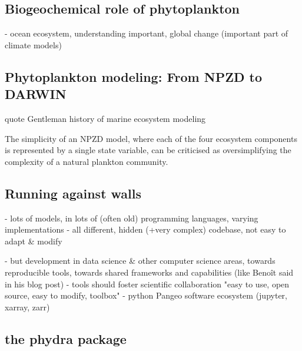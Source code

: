 \documentclass[journal abbreviation, manuscript]{copernicus}
\begin{document}
\introduction  %



\subsection{Biogeochemical role of phytoplankton}
- ocean ecosystem, understanding important, global change (important part of climate models)

\subsection{Phytoplankton modeling: From NPZD to DARWIN}
quote Gentleman history of marine ecosystem modeling

The simplicity of an NPZD model, where each of the four ecosystem components is represented by a single state variable, can be criticised as oversimplifying the complexity of a natural plankton community.

\subsection{Running against walls}

- lots of models, in lots of (often old) programming languages, varying implementations
- all different, hidden (+very complex) codebase, not easy to adapt \& modify

- but development in data science & other computer science areas, towards reproducible tools, towards shared frameworks and capabilities (like Benoît said in his blog post)
- tools should foster scientific collaboration
"easy to use, open source, easy to modify, toolbox"
- python Pangeo software ecosystem (jupyter, xarray, zarr)

\subsection{the phydra package}
\end{document}
